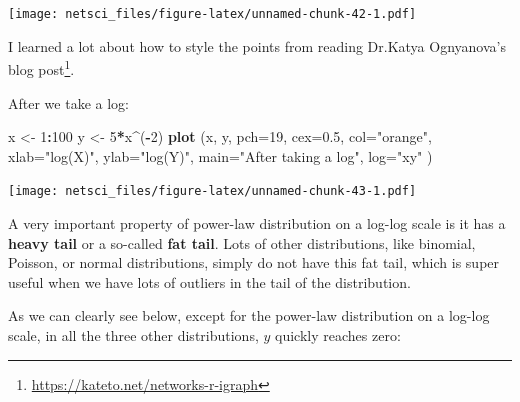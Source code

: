 \documentclass[
]{krantz}
\makeatletter
\newenvironment{Shaded}{\begin{snugshade}}{\end{snugshade}}
\newcommand{\DataTypeTok}[1]{\textcolor[rgb]{0.27,0.27,0.27}{#1}}
\newcommand{\DecValTok}[1]{\textcolor[rgb]{0.06,0.06,0.06}{#1}}
\newcommand{\FloatTok}[1]{\textcolor[rgb]{0.06,0.06,0.06}{#1}}
\newcommand{\KeywordTok}[1]{\textcolor[rgb]{0.27,0.27,0.27}{\textbf{#1}}}
\newcommand{\NormalTok}[1]{#1}
\newcommand{\OperatorTok}[1]{\textcolor[rgb]{0.43,0.43,0.43}{\textbf{#1}}}
\newcommand{\StringTok}[1]{\textcolor[rgb]{0.5,0.5,0.5}{#1}}
\renewcommand{\href}[2]{#2\footnote{\url{#1}}}
\newenvironment{kframe}{%
\medskip{}
\setlength{\fboxsep}{.8em}
 \def\at@end@of@kframe{}%
 \ifinner\ifhmode%
  \def\at@end@of@kframe{\end{minipage}}%
  \begin{minipage}{\columnwidth}%
 \fi\fi%
 \def\FrameCommand##1{\hskip\@totalleftmargin \hskip-\fboxsep
 \colorbox{shadecolor}{##1}\hskip-\fboxsep
     \hskip-\linewidth \hskip-\@totalleftmargin \hskip\columnwidth}%
 \MakeFramed {\advance\hsize-\width
   \@totalleftmargin\z@ \linewidth\hsize
   \@setminipage}}%
 {\par\unskip\endMakeFramed%
 \at@end@of@kframe}
\renewenvironment{Shaded}{\begin{kframe}}{\end{kframe}}
\makeatother
\begin{document}
\texttt{[image: netsci\_files/figure-latex/unnamed-chunk-42-1.pdf]}

I learned a lot about how to style the points from reading \href{https://kateto.net/networks-r-igraph}{Dr.Katya Ognyanova's blog post}.

After we take a log:

\begin{Shaded}
\begin{Highlighting}[]
\NormalTok{x <-}\StringTok{ }\DecValTok{1}\OperatorTok{:}\DecValTok{100}
\NormalTok{y <-}\StringTok{ }\DecValTok{5}\OperatorTok{*}\NormalTok{x}\OperatorTok{^}\NormalTok{(}\OperatorTok{-}\DecValTok{2}\NormalTok{)}
\KeywordTok{plot}\NormalTok{ (x, y, }\DataTypeTok{pch=}\DecValTok{19}\NormalTok{, }\DataTypeTok{cex=}\FloatTok{0.5}\NormalTok{, }\DataTypeTok{col=}\StringTok{"orange"}\NormalTok{,}
      \DataTypeTok{xlab=}\StringTok{"log(X)"}\NormalTok{, }\DataTypeTok{ylab=}\StringTok{"log(Y)"}\NormalTok{,}
      \DataTypeTok{main=}\StringTok{"After taking a log"}\NormalTok{,}
      \DataTypeTok{log=}\StringTok{"xy"}
\NormalTok{      )}
\end{Highlighting}
\end{Shaded}

\texttt{[image: netsci\_files/figure-latex/unnamed-chunk-43-1.pdf]}

A very important property of power-law distribution on a log-log scale is it has a \textbf{heavy tail} or a so-called \textbf{fat tail}. Lots of other distributions, like binomial, Poisson, or normal distributions, simply do not have this fat tail, which is super useful when we have lots of outliers in the tail of the distribution.

As we can clearly see below, except for the power-law distribution on a log-log scale, in all the three other distributions, \(y\) quickly reaches zero:
\end{document}
